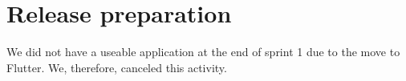 \section{Release preparation}

We did not have a useable application at the end of sprint 1 due to the move to Flutter. We, therefore, canceled this activity.
